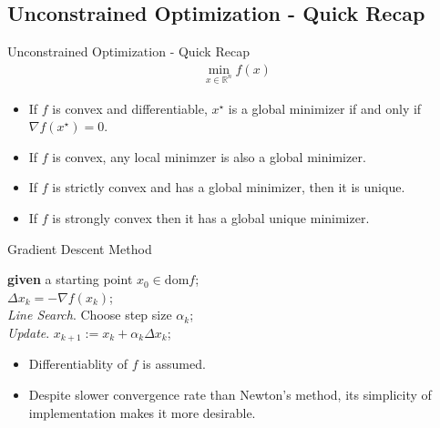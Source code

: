 \documentclass{beamer}
\begin{document}
\subsection{Unconstrained Optimization - Quick Recap}
\begin{frame}{Unconstrained Optimization - Quick Recap}
\begin{align*}
    \min_{x\in\mathbb{R}^n}f(x)
\end{align*}
\pause
\begin{itemize}
    \item If $f$ is convex and differentiable, $x^\star$ is a global minimizer if and only if $\nabla f(x^\star)=0$.
    \pause
    \item If $f$ is convex, any local minimzer is also a global minimizer.
    \pause
    \item If $f$ is strictly convex and has a global minimizer, then it is unique.
    \pause
    \item If $f$ is strongly convex then it has a global unique minimizer.
\end{itemize}
\end{frame}

\begin{frame}{Gradient Descent Method}
    \begin{algorithm}[H]
        
    	\textbf{given} a starting point $x_0\in\mathrm{dom} f$;\\
     	{
      		$\Delta x_k=-\nabla f(x_k)$;\\
                \textit{Line Search}. Choose step size $\alpha_k$;\\
                \textit{Update}. $x_{k+1}:=x_{k}+\alpha_k\Delta x_k$;
      	}
    \end{algorithm}
    \pause\vspace{20pt}
    \begin{itemize}
        \item Differentiablity of $f$ is assumed.
        \pause
        \item Despite slower convergence rate than Newton's method, its simplicity of implementation makes it more desirable.
    \end{itemize}
\end{frame}
\end{document}

